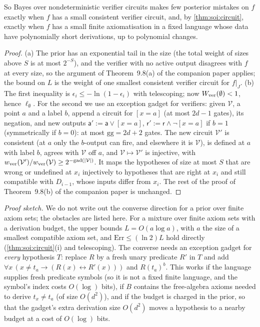 So Bayes over nondeterministic verifier circuits makes few posterior mistakes on $f$ exactly when $f$ has a small consistent verifier circuit, and, by \cref{thm:soi:circuit}, exactly when $f$ has a small finite axiomatisation in a fixed language whose data have polynomially short derivations, up to polynomial changes.

\begin{proof}
(a) The prior has an exponential tail in the size (the total weight of sizes above $S$ is at most $2^{-S}$), and the verifier with no active output disagrees with $f$ at every size, so the argument of Theorem~9.8(a) of the companion paper applies; the bound on $L$ is the weight of one smallest consistent verifier circuit for $f|_J$. (b) The first inequality is $\epsilon_i\le-\ln(1-\epsilon_i)$ with telescoping; now $W_{\rm ver}(\emptyset)<1$, hence $\ell_\emptyset$. For the second we use an exception gadget for verifiers: given $\mathcal V$, a point $a$ and a label $b$, append a circuit for $[x=a]$ (at most $2d-1$ gates), its negation, and new outputs $\mathsf a':=\mathsf a\vee[x=a]$, $\mathsf r':=\mathsf r\wedge\neg[x=a]$ if $b=1$ (symmetrically if $b=0$): at most $\mathrm{gg}=2d+2$ gates. The new circuit $\mathcal V'$ is consistent (at $a$ only the $b$-output can fire, and elsewhere it is $\mathcal V$), is defined at $a$ with label $b$, agrees with $\mathcal V$ off $a$, and $\mathcal V\mapsto\mathcal V'$ is injective, with $w_{\rm ver}(\mathcal V')/w_{\rm ver}(\mathcal V)\ge2^{-\mathrm{gad}(\lvert\mathcal V\rvert)}$. It maps the hypotheses of size at most $S$ that are wrong or undefined at $x_i$ injectively to hypotheses that are right at $x_i$ and still compatible with $D_{i-1}$, whose inputs differ from $x_i$. The rest of the proof of Theorem~9.8(b) of the companion paper is unchanged.
\end{proof}

\begin{remark}\label{rem:soi:axiomsetprior}
\emph{Proof sketch.} We do not write out the converse direction for a prior over finite axiom sets; the obstacles are listed here. For a mixture over finite axiom sets with a derivation budget, the upper bounds $L=O(a\log a)$, with $a$ the size of a smallest compatible axiom set, and $\mathrm{Err}\le(\ln2)L$ hold directly (\cref{thm:soi:circuit}(i) and telescoping). The converse needs an exception gadget for \emph{every} hypothesis $T$: replace $R$ by a fresh unary predicate $R'$ in $T$ and add $\forall x\,(x\ne t_a\to(R(x)\leftrightarrow R'(x)))$ and $R(t_a)^b$. This works if the language supplies fresh predicate symbols (so it is not a fixed finite language, and the symbol's index costs $O(\log)$ bits), if $B$ contains the free-algebra axioms needed to derive $t_x\ne t_a$ (of size $O(d^2)$), and if the budget is charged in the prior, so that the gadget's extra derivation size $O(d^2)$ moves a hypothesis to a nearby budget at a cost of $O(\log)$ bits.
\end{remark}
